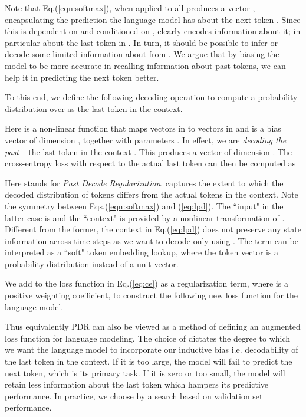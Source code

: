 \documentclass{article} \usepackage{iclr2019_conference,times}
\begin{document}
 
Note that Eq.(\ref{eqn:softmax}), when applied to all  produces a   vector , encapsulating the prediction the language model has about the next token . 
Since this is dependent on and conditioned on ,  clearly encodes information about it; in particular about the last token  in . 
In turn, it should be possible to  infer or decode some limited information about  from . 
We argue that by biasing the model to be more accurate in recalling information about past tokens, we can help it in predicting  the next token better. 

To this end,  we define the following decoding operation to compute a probability distribution over  as the last token in the context.

Here  is a non-linear function that maps vectors in  to vectors in  and  is a bias vector of dimension , together with parameters . In effect, we are \emph{decoding the past} -- the last token in the context .  
This produces a vector    of dimension . The cross-entropy loss with respect to the actual last token  can then be computed as 

Here  stands for \emph{Past Decode Regularization}.  captures the extent to which the decoded distribution of tokens differs from the actual tokens  in the context. Note the symmetry between Eqs.(\ref{eqn:softmax}) and (\ref{eq:lpd}).  The ``input" in the latter case is  and the ``context" is provided by a nonlinear transformation of . Different from the former, the context in Eq.(\ref{eq:lpd}) does not preserve any state information across time steps as we want to decode only using . 
The term  can be interpreted as a ``soft" token embedding lookup, where the token vector  is a probability distribution instead of a unit vector. 


We add  to the loss function in Eq.(\ref{eq:ce}) as a regularization term, where  is a positive weighting coefficient, to construct the following new loss function for the language model.

Thus equivalently PDR can also be viewed as a method of defining an augmented loss function for language modeling. The choice of  dictates the degree to which we want the language model to incorporate our inductive bias i.e. decodability of the last token in the context. If it is too large, the model will fail to predict the next token, which is its primary task. If it is zero or too small, the model will retain less information about the last token which hampers its predictive performance. In practice, we choose  by a search based on validation set performance. 
\end{document}
